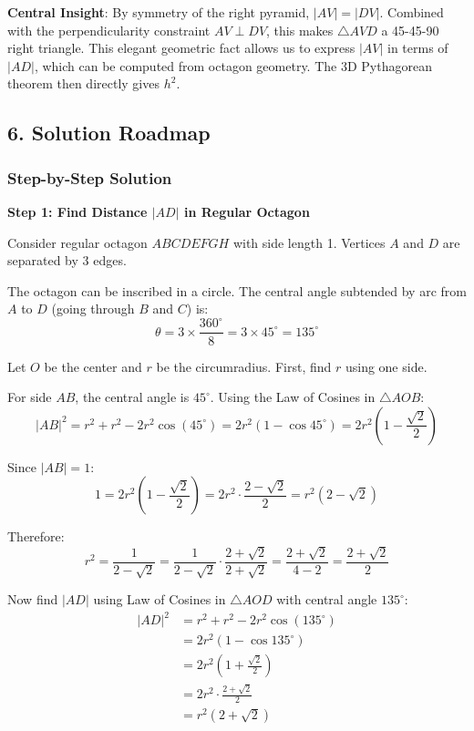 \documentclass[12pt]{article}
\begin{document}
\begin{keyinsight}
\textbf{Central Insight}: By symmetry of the right pyramid, $|AV| = |DV|$. Combined with the perpendicularity constraint $AV \perp DV$, this makes $\triangle AVD$ a 45-45-90 right triangle. This elegant geometric fact allows us to express $|AV|$ in terms of $|AD|$, which can be computed from octagon geometry. The 3D Pythagorean theorem then directly gives $h^2$.
\end{keyinsight}

\begin{solutionbox}
\subsection*{6. Solution Roadmap}

\subsubsection*{Step-by-Step Solution}

\textbf{Step 1: Find Distance $|AD|$ in Regular Octagon}

Consider regular octagon $ABCDEFGH$ with side length 1. Vertices $A$ and $D$ are separated by 3 edges.

The octagon can be inscribed in a circle. The central angle subtended by arc from $A$ to $D$ (going through $B$ and $C$) is:
$$\theta = 3 \times \frac{360^\circ}{8} = 3 \times 45^\circ = 135^\circ$$

Let $O$ be the center and $r$ be the circumradius. First, find $r$ using one side.

For side $AB$, the central angle is $45^\circ$. Using the Law of Cosines in $\triangle AOB$:
$$|AB|^2 = r^2 + r^2 - 2r^2\cos(45^\circ) = 2r^2(1 - \cos 45^\circ) = 2r^2\left(1 - \frac{\sqrt{2}}{2}\right)$$

Since $|AB| = 1$:
$$1 = 2r^2\left(1 - \frac{\sqrt{2}}{2}\right) = 2r^2 \cdot \frac{2-\sqrt{2}}{2} = r^2(2-\sqrt{2})$$

Therefore:
$$r^2 = \frac{1}{2-\sqrt{2}} = \frac{1}{2-\sqrt{2}} \cdot \frac{2+\sqrt{2}}{2+\sqrt{2}} = \frac{2+\sqrt{2}}{4-2} = \frac{2+\sqrt{2}}{2}$$

Now find $|AD|$ using Law of Cosines in $\triangle AOD$ with central angle $135^\circ$:
\begin{align*}
|AD|^2 &= r^2 + r^2 - 2r^2\cos(135^\circ) \\
&= 2r^2(1 - \cos 135^\circ) \\
&= 2r^2\left(1 + \frac{\sqrt{2}}{2}\right) \\
&= 2r^2 \cdot \frac{2+\sqrt{2}}{2} \\
&= r^2(2+\sqrt{2})
\end{align*}


\end{solutionbox}
\end{document}
